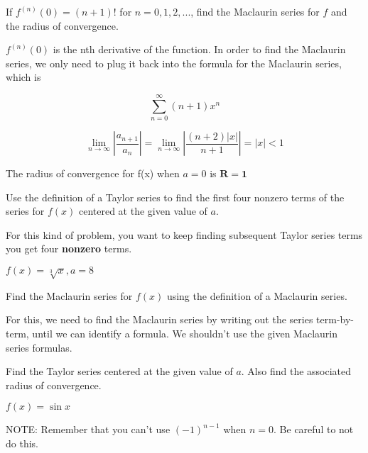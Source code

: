 \documentclass[12pt]{article}
\begin{document}
If $f^{(n)}(0) = (n + 1)!$ for $n = 0, 1, 2, ...$, find the Maclaurin series for $f$ and the radius of convergence.

\begin{solution}
$f^{(n)}(0)$ is the nth derivative of the function. In order to find the Maclaurin series, we only need to plug it back into the formula for the Maclaurin series, which is


$$\sum_{n=0}^{\infty} (n + 1)x^{n}$$

$$\lim_{n \to \infty} \left| \frac{a_{n+1}}{a_n} \right| = \lim_{n \to \infty} \left| \frac{(n + 2)|x|}{n + 1} \right| = |x| < 1$$ 

The radius of convergence for f(x) when $a = 0$ is $\mathbf{R = 1}$

\end{solution}

Use the definition of a Taylor series to find the first four nonzero terms of the series for $f(x)$ centered at the given value of $a$.


\begin{solution}

For this kind of problem, you want to keep finding subsequent Taylor series terms you get four \textbf{nonzero} terms. 

$f(x) = \sqrt[3]{x}, a = 8$


\end{solution}

Find the Maclaurin series for $f(x)$ using the definition of a Maclaurin series.


\begin{solution}

For this, we need to find the Maclaurin series by writing out the series term-by-term, until we can identify a formula. We shouldn't use the given Maclaurin series formulas.



\end{solution}


Find the Taylor series centered at the given value of $a$. Also find the associated radius of convergence.


\begin{solution}

$f(x) = \sin{x}$

NOTE: Remember that you can't use $(-1)^{n -1}$ when $n = 0$. Be careful to not do this.

\end{solution}
\end{document}

